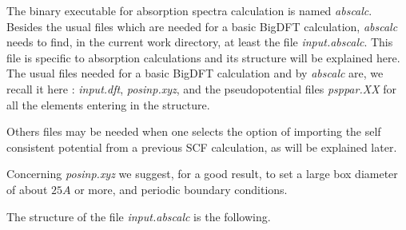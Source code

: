 \documentclass[a4paper,11pt]{report}
\begin{document}
The binary executable for absorption spectra calculation is named {\it abscalc}.
 Besides the usual files which  are needed for
a basic BigDFT calculation,  {\it abscalc} needs to find, 
 in the current  work directory, at least the file  {\it input.abscalc}. 
This file is specific to absorption calculations and 
its structure will be explained  here.
The  usual files needed for a basic BigDFT calculation and by {\it
  abscalc} are, we recall it here : {\it input.dft},
{\it posinp.xyz}, and the pseudopotential files {\it psppar.XX} for
all the elements entering in the structure.

Others files may be needed when one selects the option of importing
the self consistent potential from a previous SCF calculation, as will
be explained later. 

Concerning {\it posinp.xyz} we suggest, for a good result,
to set a large box diameter of about $25A$ or more, and periodic
boundary conditions.

The structure of the file   {\it input.abscalc} is the following.
\end{document}
